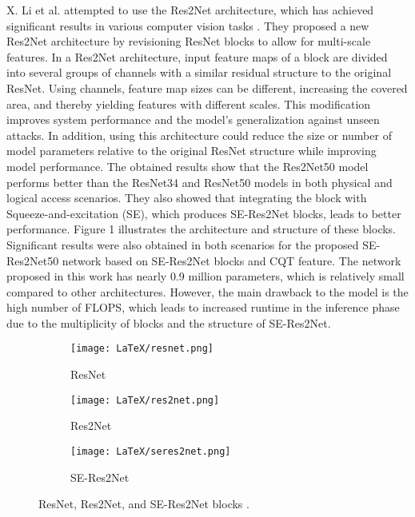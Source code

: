 \documentclass[a4paper]{article}
\begin{document}
X. Li et al. attempted to use the Res2Net architecture, which has achieved significant results in various computer vision tasks \cite{23li2021replay}. They proposed a new Res2Net architecture by revisioning ResNet blocks to allow for multi-scale features. In a Res2Net architecture, input feature maps of a block are divided into several groups of channels with a similar residual structure to the original ResNet. Using channels, feature map sizes can be different, increasing the covered area, and thereby yielding features with different scales. This modification improves system performance and the model's generalization against unseen attacks. In addition, using this architecture could reduce the size or number of model parameters relative to the original ResNet structure while improving model performance. The obtained results show that the Res2Net50 model performs better than the ResNet34 and ResNet50 models in both physical and logical access scenarios. They also showed that integrating the block with Squeeze-and-excitation (SE), which produces SE-Res2Net blocks, leads to better performance. Figure 1 illustrates the architecture and structure of these blocks. Significant results were also obtained in both scenarios for the proposed SE-Res2Net50 network based on SE-Res2Net blocks and CQT feature. The network proposed in this work has nearly 0.9 million parameters, which is relatively small compared to other architectures. However, the main drawback to the model is the high number of FLOPS, which leads to increased runtime in the inference phase due to the multiplicity of blocks and the structure of SE-Res2Net.
\begin{figure}[H]
    \centering
    \begin{subfigure}[b]{0.12\textwidth}
        \centering
        \texttt{[image: LaTeX/resnet.png]}
        \caption{ResNet}
    \end{subfigure}
    \hfill
    \begin{subfigure}[b]{0.12\textwidth}
        \centering
        \texttt{[image: LaTeX/res2net.png]}
        \caption{Res2Net}
    \end{subfigure}
    \hfill
    \begin{subfigure}[b]{0.12\textwidth}
        \centering
        \texttt{[image: LaTeX/seres2net.png]}
        \caption{SE-Res2Net}
    \end{subfigure}
    \hfill
    \label{fig:seres}
    \caption{ResNet, Res2Net, and SE-Res2Net blocks \cite{23li2021replay}.}
\end{figure}
\end{document}
